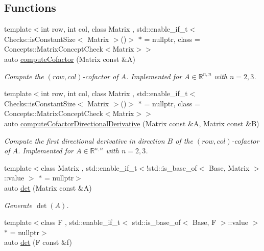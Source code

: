 \subsection*{Functions}
\begin{DoxyCompactItemize}
\item 
{\footnotesize template$<$int row, int col, class Matrix , std\+::enable\+\_\+if\+\_\+t$<$ Checks\+::is\+Constant\+Size$<$ Matrix $>$()$>$ $\ast$  = nullptr, class  = Concepts\+::\+Matrix\+Concept\+Check$<$\+Matrix$>$$>$ }\\auto \hyperlink{group__LinearAlgebraGroup_gace32a0876d4a8333f3bfc564316085ed}{compute\+Cofactor} (Matrix const \&A)
\begin{DoxyCompactList}\small\item\em Compute the $(row,col)$-\/cofactor of $ A $. Implemented for $ A\in \mathbb{R}^{n,n} $ with $ n=2,3 $. \end{DoxyCompactList}\item 
{\footnotesize template$<$int row, int col, class Matrix , std\+::enable\+\_\+if\+\_\+t$<$ Checks\+::is\+Constant\+Size$<$ Matrix $>$()$>$ $\ast$  = nullptr, class  = Concepts\+::\+Matrix\+Concept\+Check$<$\+Matrix$>$$>$ }\\auto \hyperlink{group__LinearAlgebraGroup_ga3970ee7fa4d47612427a59cecf56746c}{compute\+Cofactor\+Directional\+Derivative} (Matrix const \&A, Matrix const \&B)
\begin{DoxyCompactList}\small\item\em Compute the first directional derivative in direction $ B $ of the $(row,col)$-\/cofactor of $ A $. Implemented for $ A\in \mathbb{R}^{n,n} $ with $ n=2,3 $. \end{DoxyCompactList}\item 
{\footnotesize template$<$class Matrix , std\+::enable\+\_\+if\+\_\+t$<$!std\+::is\+\_\+base\+\_\+of$<$ Base, Matrix $>$\+::value $>$ $\ast$  = nullptr$>$ }\\auto \hyperlink{group__LinearAlgebraGroup_gadb3017b4b2828e25a0784b10396a836f}{det} (Matrix const \&A)
\begin{DoxyCompactList}\small\item\em Generate $\det(A)$. \end{DoxyCompactList}\item 
{\footnotesize template$<$class F , std\+::enable\+\_\+if\+\_\+t$<$ std\+::is\+\_\+base\+\_\+of$<$ Base, F $>$\+::value $>$ $\ast$  = nullptr$>$ }\\auto \hyperlink{group__LinearAlgebraGroup_ga552048de67f3412ae0a220b3123db6e5}{det} (F const \&f)

\end{DoxyCompactItemize}
